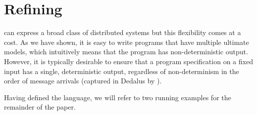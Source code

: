 \section{Refining \large \bf \lang}
\label{sec:confluence}


\lang can express a broad class of distributed systems but this flexibility comes at a cost.
As we have shown, it is easy to write programs that have multiple ultimate models, which intuitively means that the program has non-deterministic output.
However, it is typically desirable to ensure that a program specification on a fixed input has a single, deterministic output, regardless of non-determinism in the order of message arrivals (captured in Dedalus by ).  

Having defined the \lang language, we will refer to two running examples for the remainder of the paper.  

